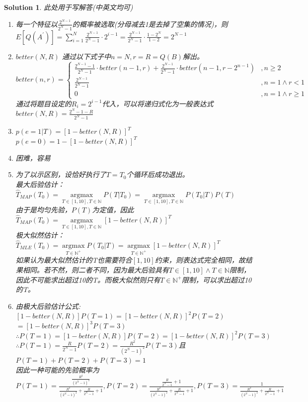 \documentclass[a4paper,UTF8]{article}
\newtheorem*{solution}{Solution}
\numberwithin{equation}{section}
\begin{document}
\begin{solution}
此处用于写解答(中英文均可)
\begin{enumerate}[(1)]
    \item 每一个特征以$\frac{2^{N-1}}{2^N-1}$的概率被选取(分母减去1是去掉了空集的情况)，则\\
        $E[Q(A^\prime)]=\sum\limits_{i=1}^N\frac{2^{N-1}}{2^N-1}\cdot 2^{i-1}=\frac{2^{N-1}}{2^N-1}\cdot \frac{1-2^N}{1-2}=2^{N-1}$
    \item $better(N,R)$ 通过以下式子中$n=N,r=R=Q(B)$解出。
        $$better(n,r) = \begin{cases}
        \frac {2^{N-1}-1}{2^N-1} \cdot better(n-1,r)+\frac{2^{N-1}}{2^N-1}\cdot better(n-1,r-2^{n-1}) & ,n \ge 2\\
        \frac{2^{N-1}}{2^N-1} & ,n=1 \wedge r < 1 \\
        0 &,n=1 \wedge r \ge 1
    \end{cases}$$
    通过将题目设定的$R_i=2^{i-1}$代入，可以将递归式化为一般表达式$better(N,R)=\frac{2^N-1-R}{2^N-1}$
    \item $p(e=1|T)=[1-better(N,R)]^T$\\
        $ p(e=0)=1-[1-better(N,R)]^T$
    \item 困难，容易
    \item 为了以示区别，设恰好执行了$T = T_0$个循环后成功退出。\\
        最大后验估计：$\hat T_{MAP}(T_0) = \mathop{\arg\max}\limits_{T\in[1,10],T \in \mathbb N} P(T|T_0)=\mathop{\arg\max}\limits_{T\in[1,10],T \in \mathbb N} P(T_0|T)P(T)$\\
        由于是均匀先验，$P(T)$为定值，因此$\hat T_{MAP}(T_0) = \mathop{\arg\max}\limits_{T\in[1,10],T \in \mathbb N} [1-better(N,R)]^T$\\
        极大似然估计：$\hat T_{MLE}(T_0) = \mathop{\arg\max}\limits_{T \in \mathbb N^+} P(T_0|T)= \mathop{\arg\max}\limits_{T \in \mathbb N^+} [1-better(N,R)]^T$\\
        如果认为最大似然估计的T也需要符合$[1,10]$约束，则表达式完全相同，故结果相同。若不然，则二者不同，因为最大后验具有$T\in[1,10] \wedge T\in\mathbb N$限制，因此不可能求出超过10的T。而极大似然则只有$T \in \mathbb N^+$限制，可以求出超过10的T。
    \item 由极大后验估计公式:\\
        $[1-better(N,R)]P(T=1) = [1-better(N,R)]^2P(T=2) $\\
        $= [1-better(N,R)]^3P(T=3)$\\
        $\therefore P(T=1)=[1-better(N,R)]P(T=2)= [1-better(N,R)]^2P(T=3)$\\
        $\therefore P(T=1)=\frac{R}{2^N-1}P(T=2)=\frac{R^2}{(2^N-1)^2}P(T=3)$且$P(T=1)+P(T=2)+P(T=3)=1$\\
        因此一种可能的先验概率为$P(T=1)=\frac{\frac{R^2}{(2^N-1)^2}}{\frac{R^2}{(2^N-1)^2}+\frac{R}{2^N-1}+1},P(T=2)=\frac{\frac{R}{2^N-1}+1}{\frac{R^2}{(2^N-1)^2}+\frac{R}{2^N-1}+1},P(T=3)=\frac{1}{\frac{R^2}{(2^N-1)^2}+\frac{R}{2^N-1}+1}$
\end{enumerate}
\end{solution}
\end{document}
